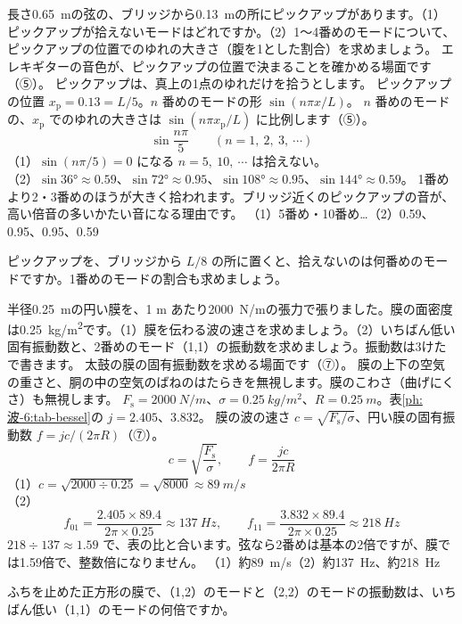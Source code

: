 \label{ph:波-6:ex8}
\begin{phreidai}[ピックアップの位置と倍音]
長さ\qty{0.65}{m}の弦の、ブリッジから\qty{0.13}{m}の所にピックアップがあります。（1）ピックアップが拾えないモードはどれですか。（2）1〜4番めのモードについて、ピックアップの位置でのゆれの大きさ（腹を1とした割合）を求めましょう。
\phbamen
エレキギターの音色が、ピックアップの位置で決まることを確かめる場面です（⑤）。
\phmushi
ピックアップは、真上の1点のゆれだけを拾うとします。
\phzu
ピックアップの位置 $x_{\mathrm p}=0.13=L/5$。$n$ 番めのモードの形 $\sin(n\pi x/L)$。
\phriyu
$n$ 番めのモードの、$x_{\mathrm p}$ でのゆれの大きさは $\sin(n\pi x_{\mathrm p}/L)$ に比例します（⑤）。
\phtateru
\[\sin\frac{n\pi}{5}\qquad(n=1,\ 2,\ 3,\ \cdots)\]
\phtoku
（1）$\sin(n\pi/5)=0$ になる $n=5,\ 10,\ \cdots$ は拾えない。\\
（2）$\sin36°\approx0.59$、$\sin72°\approx0.95$、$\sin108°\approx0.95$、$\sin144°\approx0.59$。
\phtashikame
1番めより2・3番めのほうが大きく拾われます。ブリッジ近くのピックアップの音が、高い倍音の多いかたい音になる理由です。
\kotae （1）5番め・10番め…（2）0.59、0.95、0.95、0.59
\end{phreidai}
\begin{jibun}
ピックアップを、ブリッジから $L/8$ の所に置くと、拾えないのは何番めのモードですか。1番めのモードの割合も求めましょう。
\end{jibun}

\label{ph:波-6:ex9}
\begin{phreidai}[太鼓の音の高さ]
半径\qty{0.25}{m}の円い膜を、1 m あたり\qty{2000}{N/m}の張力で張りました。膜の面密度は\qty{0.25}{kg/m^2}です。（1）膜を伝わる波の速さを求めましょう。（2）いちばん低い固有振動数と、2番めのモード（1,1）の振動数を求めましょう。振動数は3けたで書きます。
\phbamen
太鼓の膜の固有振動数を求める場面です（⑦）。
\phmushi
膜の上下の空気の重さと、胴の中の空気のばねのはたらきを無視します。膜のこわさ（曲げにくさ）も無視します。
\phzu
$F_{\mathrm s}=\qty{2000}{N/m}$、$\sigma=\qty{0.25}{kg/m^2}$、$R=\qty{0.25}{m}$。表\ref{ph:波-6:tab-bessel}の $j=2.405$、3.832。
\phriyu
膜の波の速さ $c=\sqrt{F_{\mathrm s}/\sigma}$、円い膜の固有振動数 $f=jc/(2\pi R)$（⑦）。
\phtateru
\[c=\sqrt{\frac{F_{\mathrm s}}{\sigma}},\qquad f=\frac{jc}{2\pi R}\]
\phtoku
（1）$c=\sqrt{2000\div0.25}=\sqrt{8000}\approx\qty{89}{m/s}$\\
（2）\[f_{01}=\frac{2.405\times89.4}{2\pi\times0.25}\approx\qty{137}{Hz},\qquad f_{11}=\frac{3.832\times89.4}{2\pi\times0.25}\approx\qty{218}{Hz}\]
\phtashikame
$218\div137\approx1.59$ で、表の比と合います。弦なら2番めは基本の2倍ですが、膜では1.59倍で、整数倍になりません。
\kotae （1）約\qty{89}{m/s}（2）約\qty{137}{Hz}、約\qty{218}{Hz}
\end{phreidai}
\begin{jibun}
ふちを止めた正方形の膜で、（1,2）のモードと（2,2）のモードの振動数は、いちばん低い（1,1）のモードの何倍ですか。
\end{jibun}

